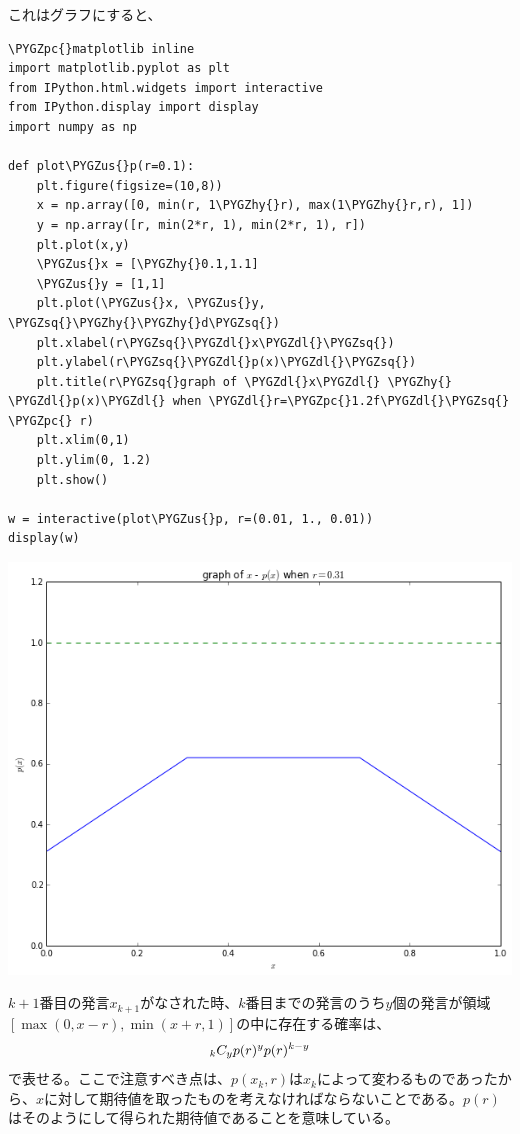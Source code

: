 \documentclass[letterpaper,10pt,english]{sphinxmanual}
\def\PYGZus{\char`\_}
\def\PYGZpc{\char`\%}
\def\PYGZdl{\char`\$}
\def\PYGZhy{\char`\-}
\def\PYGZsq{\char`\'}
\begin{document}
これはグラフにすると、

\begin{Verbatim}[commandchars=\\\{\}]
\PYGZpc{}matplotlib inline
import matplotlib.pyplot as plt
from IPython.html.widgets import interactive
from IPython.display import display
import numpy as np

def plot\PYGZus{}p(r=0.1):
    plt.figure(figsize=(10,8))
    x = np.array([0, min(r, 1\PYGZhy{}r), max(1\PYGZhy{}r,r), 1])
    y = np.array([r, min(2*r, 1), min(2*r, 1), r])
    plt.plot(x,y)
    \PYGZus{}x = [\PYGZhy{}0.1,1.1]
    \PYGZus{}y = [1,1]
    plt.plot(\PYGZus{}x, \PYGZus{}y, \PYGZsq{}\PYGZhy{}\PYGZhy{}d\PYGZsq{})
    plt.xlabel(r\PYGZsq{}\PYGZdl{}x\PYGZdl{}\PYGZsq{})
    plt.ylabel(r\PYGZsq{}\PYGZdl{}p(x)\PYGZdl{}\PYGZsq{})
    plt.title(r\PYGZsq{}graph of \PYGZdl{}x\PYGZdl{} \PYGZhy{} \PYGZdl{}p(x)\PYGZdl{} when \PYGZdl{}r=\PYGZpc{}1.2f\PYGZdl{}\PYGZsq{} \PYGZpc{} r)
    plt.xlim(0,1)
    plt.ylim(0, 1.2)
    plt.show()

w = interactive(plot\PYGZus{}p, r=(0.01, 1., 0.01))
display(w)
\end{Verbatim}

\includegraphics{output_23_0.png}

\(k+1\)番目の発言\(x_{k+1}\)がなされた時、\(k\)番目までの発言のうち\(y\)個の発言が領域\([\max(0,x-r), \min(x+r,1)]\)の中に存在する確率は、
\begin{gather}
\begin{split}_{k}C_{y}p(r)^{y}p(r)^{k-y}\end{split}\notag
\end{gather}
で表せる。ここで注意すべき点は、\(p(x_{k}, r)\)は\(x_{k}\)によって変わるものであったから、\(x\)に対して期待値を取ったものを考えなければならないことである。\(p(r)\)はそのようにして得られた期待値であることを意味している。
\end{document}
